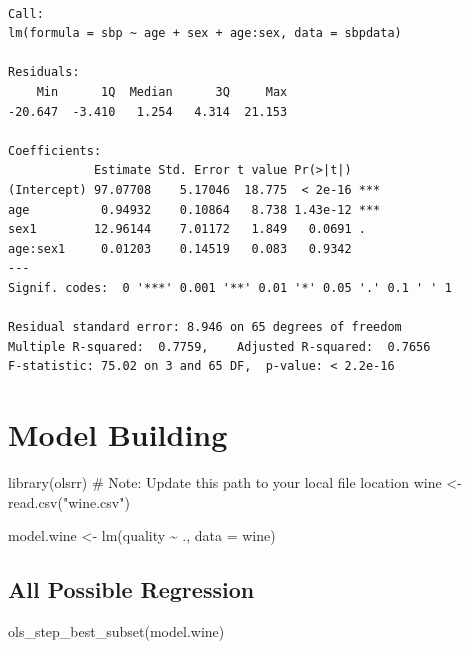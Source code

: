 \documentclass[
  letterpaper,
]{scrbook}
\newenvironment{Shaded}{\begin{snugshade}}{\end{snugshade}}
\newcommand{\AttributeTok}[1]{\textcolor[rgb]{0.40,0.45,0.13}{#1}}
\newcommand{\CommentTok}[1]{\textcolor[rgb]{0.37,0.37,0.37}{#1}}
\newcommand{\FunctionTok}[1]{\textcolor[rgb]{0.28,0.35,0.67}{#1}}
\newcommand{\NormalTok}[1]{\textcolor[rgb]{0.00,0.23,0.31}{#1}}
\newcommand{\OtherTok}[1]{\textcolor[rgb]{0.00,0.23,0.31}{#1}}
\newcommand{\SpecialCharTok}[1]{\textcolor[rgb]{0.37,0.37,0.37}{#1}}
\newcommand{\StringTok}[1]{\textcolor[rgb]{0.13,0.47,0.30}{#1}}
\begin{document}
\begin{verbatim}

Call:
lm(formula = sbp ~ age + sex + age:sex, data = sbpdata)

Residuals:
    Min      1Q  Median      3Q     Max 
-20.647  -3.410   1.254   4.314  21.153 

Coefficients:
            Estimate Std. Error t value Pr(>|t|)    
(Intercept) 97.07708    5.17046  18.775  < 2e-16 ***
age          0.94932    0.10864   8.738 1.43e-12 ***
sex1        12.96144    7.01172   1.849   0.0691 .  
age:sex1     0.01203    0.14519   0.083   0.9342    
---
Signif. codes:  0 '***' 0.001 '**' 0.01 '*' 0.05 '.' 0.1 ' ' 1

Residual standard error: 8.946 on 65 degrees of freedom
Multiple R-squared:  0.7759,    Adjusted R-squared:  0.7656 
F-statistic: 75.02 on 3 and 65 DF,  p-value: < 2.2e-16
\end{verbatim}

\section{Model Building}\label{model-building}

\begin{Shaded}
\begin{Highlighting}[]
\FunctionTok{library}\NormalTok{(olsrr)}
\CommentTok{\# Note: Update this path to your local file location}
\NormalTok{wine }\OtherTok{\textless{}{-}} \FunctionTok{read.csv}\NormalTok{(}\StringTok{"wine.csv"}\NormalTok{)}

\NormalTok{model.wine }\OtherTok{\textless{}{-}} \FunctionTok{lm}\NormalTok{(quality }\SpecialCharTok{\textasciitilde{}}\NormalTok{ ., }\AttributeTok{data =}\NormalTok{ wine)}
\end{Highlighting}
\end{Shaded}

\subsection{All Possible Regression}\label{all-possible-regression}

\begin{Shaded}
\begin{Highlighting}[]
\FunctionTok{ols\_step\_best\_subset}\NormalTok{(model.wine)}
\end{Highlighting}
\end{Shaded}
\end{document}
